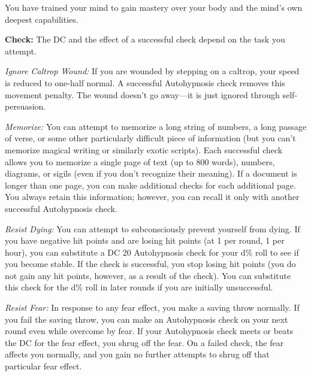 You have trained your mind to gain mastery over your body and the mind's own deepest capabilities.

\textbf{Check:} The DC and the effect of a successful check depend on the task you attempt.


\textit{Ignore Caltrop Wound:} If you are wounded by stepping on a caltrop, your speed is reduced to one-half normal. A successful Autohypnosis check removes this movement penalty. The wound doesn't go away---it is just ignored through self-persuasion.

\textit{Memorize:} You can attempt to memorize a long string of numbers, a long passage of verse, or some other particularly difficult piece of information (but you can't memorize magical writing or similarly exotic scripts). Each successful check allows you to memorize a single page of text (up to 800 words), numbers, diagrams, or sigils (even if you don't recognize their meaning). If a document is longer than one page, you can make additional checks for each additional page. You always retain this information; however, you can recall it only with another successful Autohypnosis check.

\textit{Resist Dying:} You can attempt to subconsciously prevent yourself from dying. If you have negative hit points and are losing hit points (at 1 per round, 1 per hour), you can substitute a DC 20 Autohypnosis check for your d\% roll to see if you become stable. If the check is successful, you stop losing hit points (you do not gain any hit points, however, as a result of the check). You can substitute this check for the d\% roll in later rounds if you are initially unsuccessful.

\textit{Resist Fear:} In response to any fear effect, you make a saving throw normally. If you fail the saving throw, you can make an Autohypnosis check on your next round even while overcome by fear. If your Autohypnosis check meets or beats the DC for the fear effect, you shrug off the fear. On a failed check, the fear affects you normally, and you gain no further attempts to shrug off that particular fear effect.

